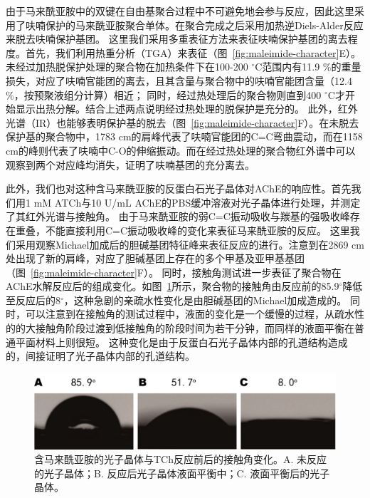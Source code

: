 由于马来酰亚胺中的双键在自由基聚合过程中不可避免地会参与反应，因此这里采用了呋喃保护的马来酰亚胺聚合单体。在聚合完成之后采用加热逆Diels-Alder反应来脱去呋喃保护基团。
这里我们采用多重表征方法来表征呋喃保护基团的离去程度。首先，我们利用热重分析（TGA）来表征（图~\ref{fig:maleimide-character}E）。未经过加热脱保护处理的聚合物在加热条件下在100-200 $^{\circ}$C范围内有11.9 \%的重量损失，对应了呋喃官能团的离去，且其含量与聚合物中的呋喃官能团含量（12.4 \%，按预聚液组分计算）相近；
同时，经过热处理后的聚合物则直到400 $^{\circ}$C才开始显示出热分解。结合上述两点说明经过热处理的脱保护是充分的。
此外，红外光谱（IR）也能够表明保护基的脱去（图~\ref{fig:maleimide-character}F）。在未脱去保护基的聚合物中，1783 cm的肩峰代表了呋喃官能团的C=C弯曲震动，而在1158 cm的峰则代表了呋喃中C-O的伸缩振动。而在经过热处理的聚合物红外谱中可以观察到两个对应峰均消失，证明了呋喃基团的充分离去。

此外，我们也对这种含马来酰亚胺的反蛋白石光子晶体对AChE的响应性。首先我们用1 mM ATCh与10 U/mL AChE的PBS缓冲溶液对光子晶体进行处理，并测定了其红外光谱与接触角。
由于马来酰亚胺的弱C=C振动吸收与羰基的强吸收峰存在重叠，不能直接利用C=C振动吸收峰的变化来表征马来酰亚胺的反应\cite{Aguiar2011Theoretical}。
这里我们采用观察Michael加成后的胆碱基团特征峰来表征反应的进行。注意到在2869 cm 处出现了新的肩峰，对应了胆碱基团上存在的多个甲基及亚甲基基团（图~\ref{fig:maleimide-character}F）。
同时，接触角测试进一步表征了聚合物在AChE水解反应后的组成变化。如图~\ref{fig:maleimide-CA}所示，聚合物的接触角由反应前的85.9$^{\circ}$降低至反应后的8$^{\circ}$，这种急剧的亲疏水性变化是由胆碱基团的Michael加成造成的。
同时，可以注意到在接触角的测试过程中，液面的变化是一个缓慢的过程，从疏水性的的大接触角阶段过渡到低接触角的阶段时间为若干分钟，而同样的液面平衡在普通平面材料上则很短。
这种变化是由于反蛋白石光子晶体内部的孔道结构造成的，间接证明了光子晶体内部的孔道结构。
\begin{figure}[htbp]
  \centering
  \includegraphics[width=\linewidth]{figures/ch3/maleimide-CA.png}
  \caption{含马来酰亚胺的光子晶体与TCh反应前后的接触角变化。A. 未反应的光子晶体；B. 反应后光子晶体液面平衡中；C. 液面平衡后的光子晶体。}
  \label{fig:maleimide-CA}
\end{figure}

